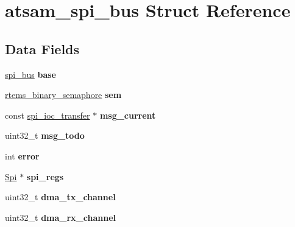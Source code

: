 \hypertarget{structatsam__spi__bus}{}\section{atsam\+\_\+spi\+\_\+bus Struct Reference}
\label{structatsam__spi__bus}
\subsection*{Data Fields}
\begin{DoxyCompactItemize}
\item 
\mbox{\label{structatsam__spi__bus_a6865c439c5d8410acb83e941e13df6cd}} 
\mbox{\hyperlink{structspi__bus}{spi\+\_\+bus}} {\bfseries base}
\item 
\mbox{\label{structatsam__spi__bus_a4dcad00efd905565b06d0fe7f4e246c1}} 
\mbox{\hyperlink{structrtems__binary__semaphore}{rtems\+\_\+binary\+\_\+semaphore}} {\bfseries sem}
\item 
\mbox{\label{structatsam__spi__bus_a4d63d184ac912a66f29a897325f14a35}} 
const \mbox{\hyperlink{structspi__ioc__transfer}{spi\+\_\+ioc\+\_\+transfer}} $\ast$ {\bfseries msg\+\_\+current}
\item 
\mbox{\label{structatsam__spi__bus_a8f2deb1decd56dee636c336c96e66d5f}} 
uint32\+\_\+t {\bfseries msg\+\_\+todo}
\item 
\mbox{\label{structatsam__spi__bus_a6e448c162ae366ee19e034580bc30732}} 
int {\bfseries error}
\item 
\mbox{\label{structatsam__spi__bus_aca49fabbea71d49af397e0d161825078}} 
\mbox{\hyperlink{structSpi}{Spi}} $\ast$ {\bfseries spi\+\_\+regs}
\item 
\mbox{\label{structatsam__spi__bus_a9b29bbddbe84205679702e03e9e889ef}} 
uint32\+\_\+t {\bfseries dma\+\_\+tx\+\_\+channel}
\item 
\mbox{\label{structatsam__spi__bus_a6a67aa225d45809690726e9669435e18}} 
uint32\+\_\+t {\bfseries dma\+\_\+rx\+\_\+channel}
\item 

\end{DoxyCompactItemize}
